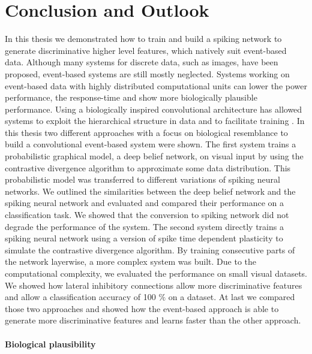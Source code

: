 \chapter{Conclusion and Outlook} \label{c:conclusion}

In this thesis we demonstrated how to train and build a spiking network to generate discriminative higher level features, which natively suit event-based data.
Although many systems for discrete data, such as images, have been proposed, event-based systems are still mostly neglected.
Systems working on event-based data with highly distributed computational units can lower the power performance, the response-time and show more biologically plausible performance.  
Using a biologically inspired convolutional architecture has allowed systems to exploit the hierarchical structure in data and to facilitate training \cite{NIPS2012_4824}.
In this thesis two different approaches with a focus on biological resemblance to build a convolutional event-based system were shown.
The first system trains a probabilistic graphical model, a deep belief network, on visual input by using the contrastive divergence algorithm to approximate some data distribution.
This probabilistic model was transferred to different variations of spiking neural networks.
We outlined the similarities between the deep belief network and the spiking neural network and evaluated and compared their performance on a classification task. 
We showed that the conversion to spiking network did not degrade the performance of the system. 
The second system directly trains a spiking neural network using a version of spike time dependent plasticity to simulate the contrastive divergence algorithm. 
By training consecutive parts of the network layerwise, a more complex system was built. Due to the computational complexity, we evaluated the performance on small visual datasets. 
We showed how lateral inhibitory connections allow more discriminative features and allow a classification accuracy of 100 $\%$ on a dataset.
At last we compared those two approaches and showed how the event-based approach is able to generate more discriminative features and learns faster than the other approach.  

\subsubsection{Biological plausibility} \label{c:bioplau}

